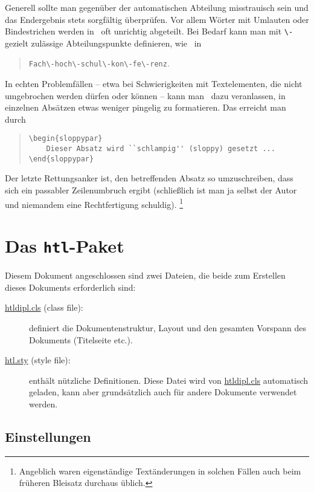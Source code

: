 Generell sollte man gegenüber der automatischen Abteilung
misstrauisch sein und das Endergebnis stets sorgfältig überprüfen.
Vor allem Wörter mit Umlauten oder Bindestrichen werden in \latex\ 
oft unrichtig abgeteilt.
Bei Bedarf kann man mit \verb!\-! gezielt zulässige Abteilungspunkte 
definieren, wie \zB\ in
%
\begin{quote}
\verb!Fach\-hoch\-schul\-kon\-fe\-renz!.
\end{quote}
%
In echten Problemfällen -- etwa bei Schwierigkeiten mit Textelementen, die nicht umgebrochen 
werden dürfen oder können -- kann man \latex\ dazu veranlassen, in einzelnen Absätzen
etwas weniger pingelig zu formatieren. Das erreicht man durch
%
\begin{quote}
\begin{verbatim}
\begin{sloppypar}
    Dieser Absatz wird ``schlampig'' (sloppy) gesetzt ...
\end{sloppypar}
\end{verbatim}
\end{quote}
%
Der letzte Rettungsanker ist, den betreffenden Absatz so umzuschreiben, dass sich ein passabler Zeilenumbruch ergibt (schließlich ist man ja selbst der Autor und niemandem eine
Rechtfertigung schuldig).%
\footnote{Angeblich waren eigenständige Textänderungen in solchen Fällen auch beim früheren Bleisatz durchaus üblich.}



\section{Das {\tt htl}-Paket}

Diesem Dokument angeschlossen sind zwei Dateien, die beide zum Erstellen dieses Dokuments erforderlich sind:
%
\begin{description}
\item[\url{htldipl.cls} (class file):] definiert die 
		Dokumentenstruktur, Layout und den gesamten Vorspann des Dokuments (Titelseite etc.).
\item[\url{htl.sty} (style file):] enthält nützliche 
		Definitionen. Diese Datei wird von \url{htldipl.cls} automatisch geladen, kann 
		aber grundsätzlich auch für andere Dokumente verwendet werden.
\end{description}


\subsection{Einstellungen}


